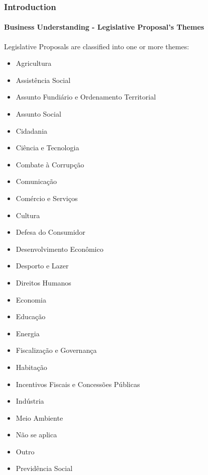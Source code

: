 \begin{frame}
	\frametitle{Introduction}
	\framesubtitle{Business Understanding - Legislative Proposal's Themes}

	


	\begin{exampleblock}{Legislative Proposals are classified into one or more themes:} 
		\begin{multicols}{3}
			\begin{itemize}
				\scriptsize
				\item Agricultura
				\item Assistência Social
				\item Assunto Fundiário e Ordenamento Territorial
				\item Assunto Social
				\item Cidadania
				\item Ciência e Tecnologia
				\item Combate à Corrupção
				\item Comunicação
				\item Comércio e Serviços
				\item Cultura
				\item Defesa do Consumidor
				\item Desenvolvimento Econômico
				\item Desporto e Lazer
				\item Direitos Humanos
				\item Economia
				\item Educação
				\item Energia
				\item Fiscalização e Governança
				\item Habitação
				\item Incentivos Fiscais e Concessões Públicas
				\item Indústria
				\item Meio Ambiente
				\item Não se aplica
				\item Outro
				\item Previdência Social

\end{itemize}
\end{multicols}
\end{exampleblock}
\end{frame}
